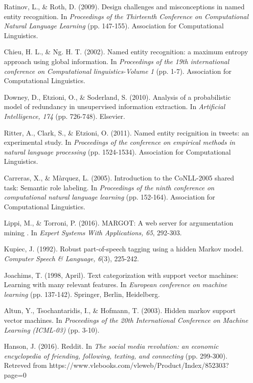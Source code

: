 \documentclass[12pt,a4paper]{article}
\begin{document}
\begin{thebibliography}{9}
  Ratinov, L., \& Roth, D. (2009). Design challenges and misconceptions in named entity recognition. In \textit{Proceedings of the Thirteenth Conference on Computational Natural Language Learning} (pp. 147-155). Association for Computational Linguistics.
  
  Chieu, H. L., \& Ng. H. T. (2002). Named entity recognition: a maximum entropy approach using global information. In \textit{Proceedings of the 19th international conference on Computational linguistics-Volume 1} (pp. 1-7). Association for Computational Linguistics.
  
  Downey, D., Etzioni, O., \& Soderland, S. (2010). Analysis of a probabilistic model of redundancy in unsupervised information extraction. In \textit{Artificial Intelligence, 174} (pp. 726-748). Elsevier.

  Ritter, A., Clark, S., \& Etzioni, O. (2011).
  Named entity recignition in tweets: an experimental study. In \textit{Proceedings of the conference on empirical methods in natural language processing} (pp. 1524-1534). Association for Computational Linguistics.
  
  Carreras, X., \& Màrquez, L. (2005). Introduction to the CoNLL-2005 shared task: Semantic role labeling. In \textit{Proceedings of the ninth conference on computational natural language learning} (pp. 152-164). Association for Computational Linguistics.
  
  Lippi, M., \& Torroni, P. (2016). MARGOT: A web server for argumentation mining . In \textit{Expert Systems With Applications, 65}, 292-303.
  
  Kupiec, J. (1992). Robust part-of-speech tagging using a hidden Markov model. \textit{Computer Speech \& Language, 6}(3), 225-242.

  Joachims, T. (1998, April). Text categorization with support vector machines: Learning with many relevant features. In \textit{European conference on machine learning} (pp. 137-142). Springer, Berlin, Heidelberg.
  
  Altun, Y., Tsochantaridis, I., \& Hofmann, T. (2003). Hidden markov support vector machines. In \textit{Proceedings of the 20th International Conference on Machine Learning (ICML-03)} (pp. 3-10).
  
  Hanson, J. (2016). Reddit. In \textit{The social media revolution: an economic encyclopedia of friending, following, texting, and connecting} (pp. 299-300). Retreved from https://www.vlebooks.com/vleweb/Product/Index/852303?page=0
  

\end{thebibliography}
\end{document}
